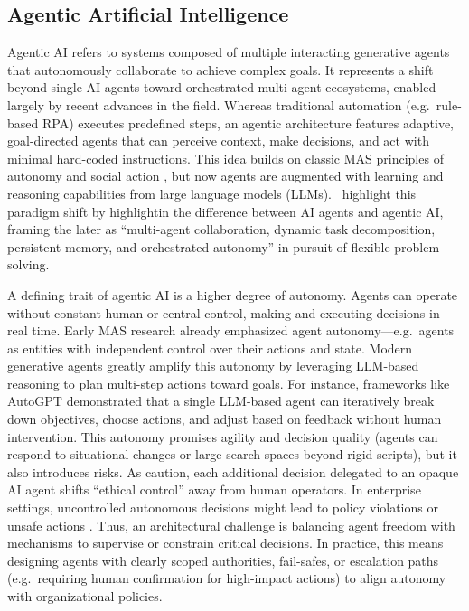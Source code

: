 \subsection{Agentic Artificial Intelligence}\label{subsec:agentic-ai}
Agentic AI refers to systems composed of multiple interacting generative agents that autonomously collaborate to achieve complex goals. It represents a shift beyond single AI agents toward orchestrated multi-agent ecosystems, enabled largely by recent advances in the field. Whereas traditional automation (e.g.~rule-based RPA) executes predefined steps, an agentic architecture features adaptive, goal-directed agents that can perceive context, make decisions, and act with minimal hard-coded instructions. This idea builds on classic MAS principles of autonomy and social action \parencite{castelfranchiModelling1998,ferberMultiagent1999}, but now agents are augmented with learning and reasoning capabilities from large language models (LLMs).~\textcite{sapkotaAI2026} highlight this paradigm shift by highlightin the difference between AI agents and agentic AI, framing the later as “multi-agent collaboration, dynamic task decomposition, persistent memory, and orchestrated autonomy” in pursuit of flexible problem-solving.

A defining trait of agentic AI is a higher degree of autonomy. Agents can operate without constant human or central control, making and executing decisions in real time. Early MAS research already emphasized agent autonomy—e.g.~agents as entities with independent control over their actions and state. Modern generative agents greatly amplify this autonomy by leveraging LLM-based reasoning to plan multi-step actions toward goals. For instance, frameworks like AutoGPT \parencite{yangAutoGPT2023} demonstrated that a single LLM-based agent can iteratively break down objectives, choose actions, and adjust based on feedback without human intervention. This autonomy promises agility and decision quality (agents can respond to situational changes or large search spaces beyond rigid scripts), but it also introduces risks. As \textcite{russellResearch2015} caution, each additional decision delegated to an opaque AI agent shifts “ethical control” away from human operators. In enterprise settings, uncontrolled autonomous decisions might lead to policy violations or unsafe actions \parencite{gauravGovernance2025}. Thus, an architectural challenge is balancing agent freedom with mechanisms to supervise or constrain critical decisions. In practice, this means designing agents with clearly scoped authorities, fail-safes, or escalation paths (e.g.~requiring human confirmation for high-impact actions) to align autonomy with organizational policies.

